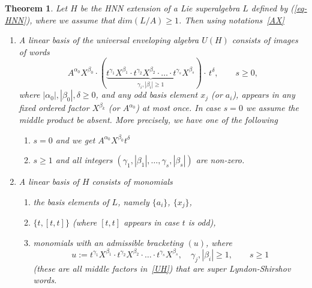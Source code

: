 \documentclass[12pt, reqno]{amsart}
\newtheorem{theorem}{Theorem}[section]
\theoremstyle{remark}
\theoremstyle{definition}
\def\b{\beta}
\numberwithin{equation}{section}
\begin{document}
\begin{theorem} \label{basisHNN} 
Let $H$ be the HNN extension of a Lie  superalgebra $L$ defined by (\ref{eq-HNN}), where we assume that $dim(L/A)\ge 1$. Then using notations~\eqref{AX}
\begin{enumerate}
\item 
A  linear  basis of the universal enveloping algebra $U(H)$ consists of images of words
\begin{equation}\label{UH}
A^{\alpha_0}X^{\beta_0}\cdot  
(\underbrace{t^{\gamma_1}X^{\beta_1}\cdot  t^{\gamma_2} X^{\beta_2}\cdot \ldots \cdot t^{\gamma_s} X^{\beta_s}}_{\gamma_i,|\beta_i|\ge 1})\cdot\,  t^{\delta},\qquad s\ge 0,
\end{equation}
where   $| \alpha_0| , |\beta_0| , \delta \ge 0$,
and any odd basis element $x_j$ (or $a_i$), appears in any fixed ordered factor $X^{\b_k}$ (or $A^{\alpha_0}$) at most once.
 In case $s= 0$ we assume the middle product be absent.  
More precisely, we have one of the following
\begin{enumerate}
\item  $s=0$ and we get $A^{\alpha_0}X^{\beta_0}t^{\delta}$ 

\item $s\ge 1$ and all integers  $( \gamma_1, |\beta_1|,\ldots, \gamma_s,|\beta_s|)$  are non-zero.
\end{enumerate}

\item  
A  linear  basis of $H$ consists of monomials
\begin{enumerate}
\item the basis elements of $L$, namely $\{a_i\}$, $\{x_j\}$,
\item $\{t, [t,t]\}$ (where $[t,t]$ appears in case $t$ is odd), 
\item 
monomials with an admissible bracketing $(u)$, where  
\begin{equation} %
u:=t^{\gamma_1}X^{\beta_1} \cdot  t^{\gamma_2} X^{\beta_2}\cdot \ldots \cdot t^{\gamma_{s}}X^{\beta_s},\quad  \gamma_j, |\beta_i| \ge 1, \qquad s\ge 1
\end{equation}
(these are all middle factors in~\eqref{UH}) that are super Lyndon-Shirshov words. 
\end{enumerate}
\end{enumerate}
\end{theorem}
\end{document}
